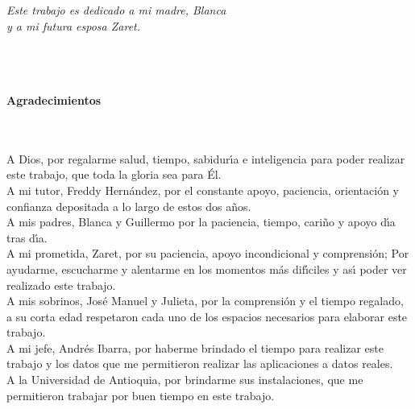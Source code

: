 \begin{flushright}
\begin{minipage}{12cm}
    \noindent
        \small
				\textsl{Este trabajo es dedicado a mi madre, Blanca\\
				y a mi futura esposa Zaret.}\\
\end{minipage}
\end{flushright}

\newpage{\pagestyle{empty}\cleardoublepage}

\newpage
\thispagestyle{empty} \textbf{}\normalsize
\\\\\\%
\textbf{\LARGE Agradecimientos}
\\\\

A Dios, por regalarme salud, tiempo, sabidur\'{\i}a e inteligencia para poder realizar este trabajo, que toda la gloria sea para \'{E}l.\\

A mi tutor, Freddy Hern\'{a}ndez, por el constante apoyo, paciencia, orientaci\'{o}n y confianza depositada a lo largo de estos dos a\~{n}os.\\

A mis padres, Blanca y Guillermo por la paciencia, tiempo, cari\~{n}o y apoyo d\'{\i}a tras d\'{\i}a.\\

A mi prometida, Zaret, por su paciencia, apoyo incondicional y comprensi\'{o}n; Por ayudarme, escucharme y alentarme en los momentos m\'{a}s dif\'{\i}ciles y as\'{\i} poder ver realizado este trabajo.\\

A mis sobrinos, Jos\'{e} Manuel y Julieta, por la comprensi\'{o}n y el tiempo regalado, a su corta edad respetaron cada uno de los espacios necesarios para elaborar este trabajo.\\

A mi jefe, Andr\'{e}s Ibarra, por haberme brindado el tiempo para realizar este trabajo y los datos que me permitieron realizar las aplicaciones a datos reales.\\

A la Universidad de Antioquia, por brindarme sus instalaciones, que me permitieron trabajar por buen tiempo en este trabajo. 

\newpage{\pagestyle{empty}\cleardoublepage}

